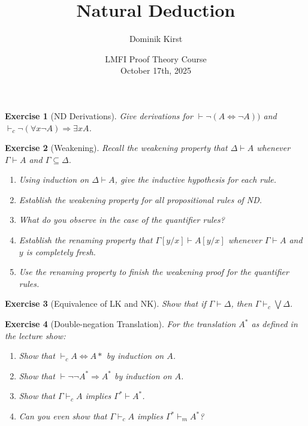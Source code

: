 \documentclass{article}
\renewcommand{\to}{\Rightarrow}
\newtheorem{exercise}{Exercise}
\begin{document}
\title{Natural Deduction}
\author{Dominik Kirst}

\date{LMFI Proof Theory Course\\October 17th, 2025}

\maketitle

\begin{exercise}[ND Derivations]
	Give derivations for $\vdash \neg (A\Leftrightarrow \neg A))$ and $\vdash_c \neg (\forall x \neg A)\to \exists x A$.
\end{exercise}

\begin{exercise}[Weakening]
	Recall the weakening property that $\Delta\vdash A$ whenever $\Gamma\vdash A$ and $\Gamma\subseteq \Delta$.
	\begin{enumerate}
		\item
		Using induction on $\Delta\vdash A$, give the inductive hypothesis for each rule.
		\item
		Establish the weakening property for all propositional rules of ND.
		\item
		What do you observe in the case of the quantifier rules?
		\item
		Establish the renaming property that $\Gamma[y/x]\vdash A[y/x]$ whenever $\Gamma\vdash A$ and $y$ is completely fresh.
		\item
		Use the renaming property to finish the weakening proof for the quantifier rules.
	\end{enumerate}
\end{exercise}

\begin{exercise}[Equivalence of LK and NK]
	Show that if $\Gamma\vdash \Delta$, then $\Gamma\vdash_c\bigvee\Delta$.
\end{exercise}

\begin{exercise}[Double-negation Translation]
	For the translation $A^*$ as defined in the lecture show:
	\begin{enumerate}
		\item
		Show that $\vdash_c A\Leftrightarrow A*$ by induction on $A$.
		\item
		Show that $\vdash \neg \neg A^*\to A^*$ by induction on $A$.
		\item
		Show that $\Gamma\vdash_c A$ implies $\Gamma^*\vdash A^*$.
		\item
		Can you even show that $\Gamma\vdash_c A$ implies $\Gamma^*\vdash_m A^*$?
	\end{enumerate}
\end{exercise}
\end{document}
